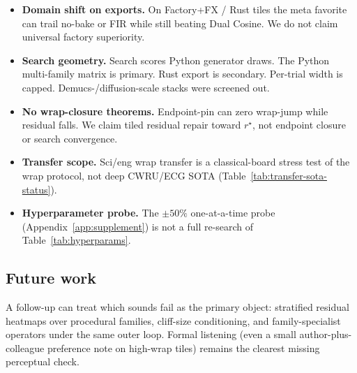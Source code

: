 \begin{itemize}
    (Table~\ref{tab:transfer-sota-status}).
  \item \textbf{Domain shift on exports.}
    On Factory+FX / Rust tiles the meta favorite can trail no-bake or FIR while still beating Dual Cosine.
    We do not claim universal factory superiority.
  \item \textbf{Search geometry.}
    Search scores Python generator draws.
    The Python multi-family matrix is primary. Rust export is secondary.
    Per-trial width is capped. Demucs-/diffusion-scale stacks were screened out.
  \item \textbf{No wrap-closure theorems.}
    Endpoint-pin can zero wrap-jump while residual falls.
    We claim tiled residual repair toward $r^{\star}$, not endpoint closure or search convergence.
  \item \textbf{Transfer scope.}
    Sci/eng wrap transfer is a classical-board stress test of the wrap protocol, not deep CWRU/ECG SOTA
    (Table~\ref{tab:transfer-sota-status}).
  \item \textbf{Hyperparameter probe.}
    The $\pm 50\%$ one-at-a-time probe (Appendix~\ref{app:supplement}) is not a full re-search of Table~\ref{tab:hyperparams}.
\end{itemize}

\subsection{Future work}
\label{sec:outlook}

A follow-up can treat which sounds fail as the primary object: stratified residual heatmaps over procedural families, cliff-size conditioning, and family-specialist operators under the same outer loop.
Formal listening (even a small author-plus-colleague preference note on high-wrap tiles) remains the clearest missing perceptual check.
